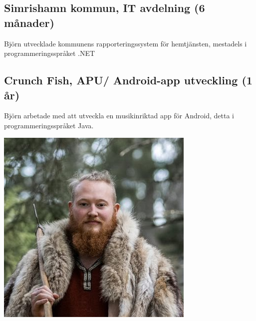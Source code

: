 \documentclass{article}
\begin{document}
\begin{minipage}[t]{0.7\textwidth}
\subsection*{\textcolor{colorRed}{Simrishamn kommun, IT avdelning (6 månader)}}
Björn utvecklade kommunens rapporteringssystem för hemtjänsten, mestadels i programmeringsspråket .NET

\subsection*{\textcolor{colorRed}{Crunch Fish, APU/ Android-app utveckling (1 år)}}
Björn arbetade med att utveckla en musikinriktad app för Android, detta i programmeringsspråket Java. 

\end{minipage}%
\hfill
\begin{minipage}[t]{0.28\textwidth}
\begin{minipage}[t]{0.8\textwidth}
\vspace{-10pt} %
  \includegraphics[width=\linewidth]{me.png}
  \label{fig:bild}
\end{minipage}
\vspace{-10pt} %

\end{minipage}
\end{document}

